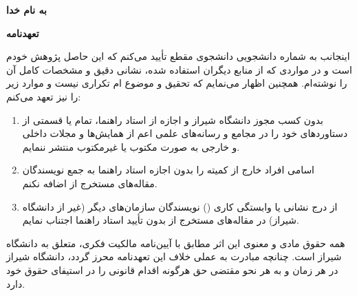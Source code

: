\centerline{\textbf{به نام خدا}}

\vspace{\baselineskip}
\centerline{\textbf{تعهدنامه}}

\vspace{\baselineskip}
اینجانب {\persianname} به شماره دانشجویی {\persianstudentnumber} دانشجوی مقطع {\persiandegree} تأیید می‌کنم که این {\persiantype} حاصل پژوهش خودم است و در مواردی که از منابع دیگران استفاده شده، نشانی دقیق و مشخصات کامل آن را نوشته‌ام. همچنین اظهار می‌نمایم که تحقیق و موضوع {\persiantype}‌ام تکراری نیست و موارد زیر را نیز تعهد می‌کنم:

\begin{enumerate}[label=\arabic*-]
    \item بدون کسب مجوز دانشگاه شیراز و اجازه از استاد راهنما، تمام یا قسمتی از دستاوردهای {\persiantype} خود را در مجامع و رسانه‌های علمی اعم از همایش‌ها و مجلات داخلی و خارجی به صورت مکتوب یا غیرمکتوب منتشر ننمایم.
    \item اسامی افراد خارج از کمیته {\persiantype} را بدون اجازه استاد راهنما به جمع نویسندگان مقاله‌های مستخرج از {\persiantype} اضافه نکنم.
    \item از درج نشانی یا وابستگی کاری () نویسندگان سازمان‌های دیگر (غیر از دانشگاه شیراز) در مقاله‌های مستخرج از {\persiantype} بدون تأیید استاد راهنما اجتناب نمایم.
\end{enumerate}

همه حقوق مادی و معنوی این اثر مطابق با آیین‌نامه مالکیت فکری، متعلق به دانشگاه شیراز است. چنانچه مبادرت به عملی خلاف این تعهدنامه محرز گردد، دانشگاه شیراز در هر زمان و به هر نحو مقتضی حق هرگونه اقدام قانونی را در استیفای حقوق خود دارد.

\vspace{2\baselineskip}
\centerline{{\persianname}}
\centerline{{\persiandefensedate}}
